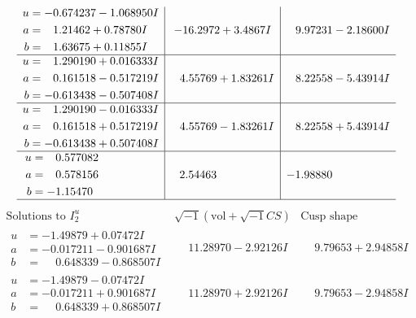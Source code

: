 \documentclass[1p]{elsarticle_modified}
\theoremstyle{definition}
\newcommand{\I}{\sqrt{-1}}
\begin{document}
$$\begin{array}{c|c|c}
\begin{aligned}
u &= -0.674237 - 1.068950 I \\
a &= \phantom{-}1.21462 + 0.78780 I \\
b &= \phantom{-}1.63675 + 0.11855 I\end{aligned}
 & -16.2972 + 3.4867 I & \phantom{-}9.97231 - 2.18600 I \\ \hline\begin{aligned}
u &= \phantom{-}1.290190 + 0.016333 I \\
a &= \phantom{-}0.161518 - 0.517219 I \\
b &= -0.613438 - 0.507408 I\end{aligned}
 & \phantom{-}4.55769 + 1.83261 I & \phantom{-}8.22558 - 5.43914 I \\ \hline\begin{aligned}
u &= \phantom{-}1.290190 - 0.016333 I \\
a &= \phantom{-}0.161518 + 0.517219 I \\
b &= -0.613438 + 0.507408 I\end{aligned}
 & \phantom{-}4.55769 - 1.83261 I & \phantom{-}8.22558 + 5.43914 I \\ \hline\begin{aligned}
u &= \phantom{-}0.577082\phantom{ +0.000000I} \\
a &= \phantom{-}0.578156\phantom{ +0.000000I} \\
b &= -1.15470\phantom{ +0.000000I}\end{aligned}
 & \phantom{-}2.54463\phantom{ +0.000000I} & -1.98880\phantom{ +0.000000I}\\
 \hline 
 \end{array}$$\newpage$$\begin{array}{c|c|c}  
\text{Solutions to }I^u_{2}& \I (\text{vol} + \sqrt{-1}CS) & \text{Cusp shape}\\
 \hline 
\begin{aligned}
u &= -1.49879 + 0.07472 I \\
a &= -0.017211 - 0.901687 I \\
b &= \phantom{-}0.648339 - 0.868507 I\end{aligned}
 & \phantom{-}11.28970 - 2.92126 I & \phantom{-}9.79653 + 2.94858 I \\ \hline\begin{aligned}
u &= -1.49879 - 0.07472 I \\
a &= -0.017211 + 0.901687 I \\
b &= \phantom{-}0.648339 + 0.868507 I\end{aligned}
 & \phantom{-}11.28970 + 2.92126 I & \phantom{-}9.79653 - 2.94858 I \\ \hline\begin{aligned}

\end{aligned}
\end{array}$$
\end{document}
